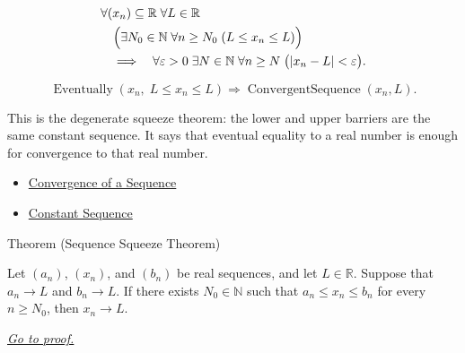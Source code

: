 \begin{remark*}
\[
\begin{aligned}
&\forall (x_n)\subseteq\mathbb{R}\;\forall L\in\mathbb{R}\\
&\quad\Bigl(
  \exists N_0\in\mathbb{N}\;\forall n\ge N_0\;(L\le x_n\le L)
\Bigr)\\
&\quad\Longrightarrow\quad
\forall \varepsilon>0\;\exists N\in\mathbb{N}\;\forall n\ge N\;
\bigl(|x_n-L|<\varepsilon\bigr).
\end{aligned}
\]
\end{remark*}

\begin{remark*}
\[
\operatorname{Eventually}(x_n,\;L\le x_n\le L)
\Longrightarrow
\operatorname{ConvergentSequence}(x_n,L).
\]
\end{remark*}

\begin{remark*}[Interpretation]
This is the degenerate squeeze theorem: the lower and upper barriers are the
same constant sequence. It says that eventual equality to a real number is
enough for convergence to that real number.
\end{remark*}

\begin{dependencies}
\begin{itemize}
  \item \hyperref[def:convergent-sequence]{Convergence of a Sequence}
  \item \hyperref[def:constant-sequence]{Constant Sequence}
\end{itemize}
\end{dependencies}


\begin{theorembox}{Theorem (Sequence Squeeze Theorem)}
\begin{theorem}
\label{thm:sequence-squeeze-theorem}

Let $(a_n)$, $(x_n)$, and $(b_n)$ be real sequences, and let
$L\in\mathbb{R}$. Suppose that $a_n\to L$ and $b_n\to L$. If there
exists $N_0\in\mathbb{N}$ such that $a_n\le x_n\le b_n$ for every
$n\ge N_0$, then $x_n\to L$.

\smallskip
\noindent
\hyperref[prf:sequence-squeeze-theorem]{\textit{Go to proof.}}
\end{theorem}
\end{theorembox}

